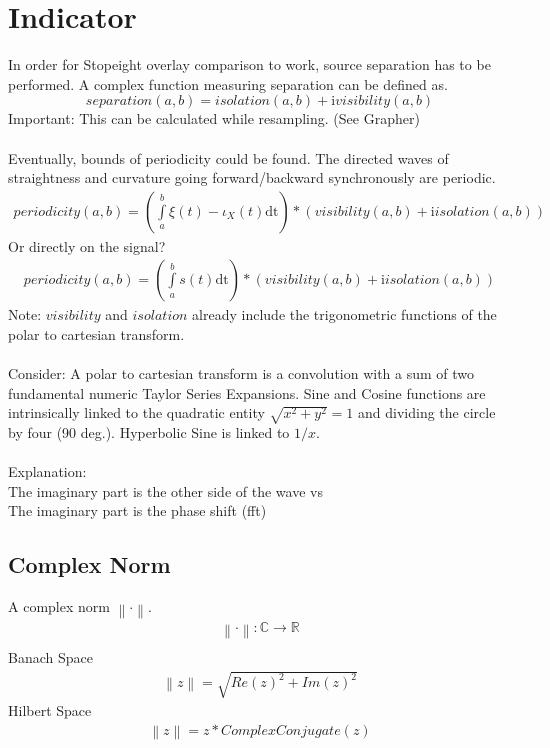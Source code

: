 \documentclass{report}
\newcommand\norm[1]{\left\lVert#1\right\rVert}
\begin{document}
\section{Indicator}
In order for Stopeight overlay comparison to work, source separation has to be performed. A complex function measuring separation can be defined as.
\begin{equation}
separation(a,b) = isolation(a,b) + \mathrm{i} visibility(a,b)
\end{equation}
Important: This can be calculated while resampling. (See Grapher)\\\\
Eventually, bounds of periodicity could be found. The directed waves of straightness and curvature going forward/backward synchronously are periodic.
\begin{align}
periodicity(a,b) =  (\int \limits _{a}^{b} \xi(t)-\iota_{X}(t) \mathrm{dt}) *(visibility(a,b) +\mathrm{i} isolation(a,b))
\end{align}
Or directly on the signal?
\begin{align}
periodicity(a,b) =  (\int \limits _{a}^{b} s(t) \mathrm{dt}) *(visibility(a,b) +\mathrm{i} isolation(a,b))
\end{align}
Note: $visibility$ and $isolation$ already include the trigonometric functions of the polar to cartesian transform.\\\\
Consider: A polar to cartesian transform is a convolution with a sum of two fundamental numeric Taylor Series Expansions. Sine and Cosine functions are intrinsically linked to the quadratic entity $\sqrt{x^2 + y^2} =1$ and dividing the circle by four (90 deg.). Hyperbolic Sine is linked to $1/x$.\\\\
Explanation:\\
The imaginary part is the other side of the wave vs\\
The imaginary part is the phase shift (fft)

\subsection*{Complex Norm}
A complex norm $\norm{\cdot}$.
\begin{align}
\norm{\cdot} : \mathbb{C} \rightarrow \mathbb{R}\\
\end{align}
Banach Space
\begin{align}
\norm{z} = \sqrt{Re(z)^2+Im(z)^2}
\end{align}
Hilbert Space
\begin{align}
\norm{z} = z*ComplexConjugate(z)
\end{align}
\end{document}
